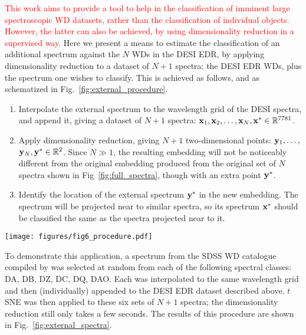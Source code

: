 \documentclass[fleqn,usenatbib]{mnras}
\def\xb{\vb{x}}
\def\yb{\vb{y}}
\newcommand{\red}[1]{\textcolor{red}{#1}}
\begin{document}
\red{
This work aims to provide a tool to help in the classification of imminent large spectroscopic WD datasets, rather than the classification of individual objects.
However, the latter can also be achieved, by using dimensionality reduction in a supervised way.
}
Here we present a means to estimate the classification of an additional spectrum against the $N$ WDs in the DESI EDR, by applying dimensionality reduction to a dataset of $N+1$ spectra: the DESI EDR WDs, plus the spectrum one wishes to classify.
This is achieved as follows, and as schematized in Fig.~\ref{fig:external_procedure}.
\begin{enumerate}
\item
Interpolate the external spectrum to the wavelength grid of the DESI spectra, and append it, giving a dataset of $N+1$ spectra: $\xb_1, \xb_2, \dots, \xb_N, \xb^* \in \mathbb{R}^{7781}$.
\item
Apply dimensionality reduction, giving $N+1$ two-dimensional points: $\yb_1, \dots,$ $\yb_N, \yb^* \in \mathbb{R}^2$.
Since $N\gg1$, the resulting embedding will not be noticeably different from the original embedding produced from the original set of $N$ spectra shown in Fig~\ref{fig:full_spectra}, though with an extra point $\yb^*$.
\item
Identify the location of the external spectrum $\yb^*$ in the new embedding.
The spectrum will be projected near to similar spectra, so its spectrum $\xb^*$ should be classified the same as the spectra projected near to it.
\end{enumerate}

\begin{figure*}
\texttt{[image: figures/fig6\_procedure.pdf]}
\caption{
    Procedure for classifying external WD spectra against DESI EDR (see text).
    One would estimate the classification of this spectrum (black) as a DA.
}
\label{fig:external_procedure}
\end{figure*}

To demonstrate this application, a spectrum from the SDSS WD catalogue compiled by \citet{gentilefusillo19} was selected at random from each of the following spectral classes: DA, DB, DZ, DC, DQ, DAO.
Each was interpolated to the same wavelength grid and then (individually) appended to the DESI EDR dataset described above.
$t$SNE was then applied to these six sets of $N+1$ spectra; the dimensionality reduction still only takes a few seconds.
The results of this procedure are shown in Fig.~\ref{fig:external_spectra}.
\end{document}
